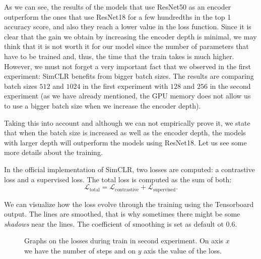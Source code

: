     As we can see, the results of the models that use ResNet50  as an encoder outperform the ones that use ResNet18 for a few hundredths in the top 1 accuracy score, and also they reach a lower value in the loss function. Since it is clear that the gain we obtain by increasing the encoder depth is minimal, we may think that it is not worth it for our model since the number of parameters that have to be trained and, thus, the time that the train takes is much higher. However, we must not forget a very important fact that we observed in the first experiment: SimCLR benefits from bigger batch sizes. The results are comparing batch sizes $512$ and $1024$ in the first experiment with $128$ and $256$ in the second experiment (as we have already mentioned, the GPU memory does not allow us to use a bigger batch size when we increase the encoder depth).

    Taking this into account and although we can not empirically prove it, we state that when the batch size is increased as well as the encoder depth, the models with larger depth will outperform the models using ResNet18. Let us see some more details about the training.

    In the official implementation of SimCLR, two losses are computed: a contrastive loss and a supervised loss. The total loss is computed as the sum of both:
    \[
    \mathcal L_{\operatorname{total}} = \mathcal L_{\operatorname{contrastive} }+ \mathcal L_{\operatorname{supervised}}.    
    \]

    We can visualize how the loss evolve through the training using the Tensorboard output. The lines are smoothed, that is why sometimes there might be some \emph{shadows} near the lines. The coefficient of smoothing is set as default ot $0.6$. 
    \begin{figure}[htp] 
        \centering
        \hfill%
            \caption{Graphs on the losses during train in second experiment. On axis $x$ we have the number of steps and on $y$ axis the value of the loss.}
            \label{fig:exp2:both:losses}
    \end{figure}


